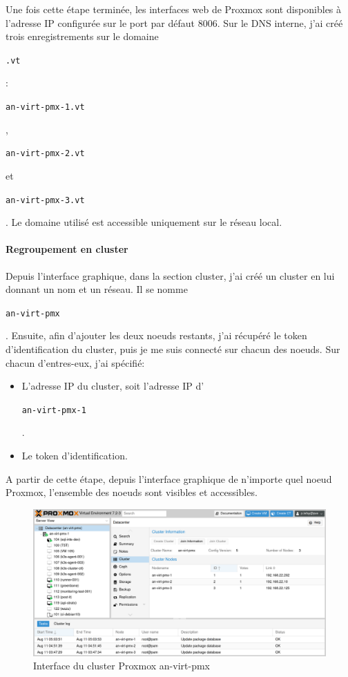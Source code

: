 \documentclass[12pt]{article}
\begin{document}
Une fois cette étape terminée, les interfaces web de \gls{Proxmox} sont disponibles à l'adresse \gls{IP} configurée sur le port par défaut 8006.
Sur le \gls{DNS} interne, j'ai créé trois enregistrements sur le domaine \begin{code}\texttt{.vt}\end{code}: \begin{code}\texttt{an-virt-pmx-1.vt}\end{code}, \begin{code}\texttt{an-virt-pmx-2.vt}\end{code} et \begin{code}\texttt{an-virt-pmx-3.vt}\end{code}.
Le domaine utilisé est accessible uniquement sur le réseau local.

\paragraph{Regroupement en \gls{cluster}}
Depuis l'interface graphique, dans la section \gls{cluster}, j'ai créé un \gls{cluster} en lui donnant un nom et un réseau. 
Il se nomme \begin{code}\texttt{an-virt-pmx}\end{code}.
Ensuite, afin d'ajouter les deux noeuds restants, j'ai récupéré le token d'identification du \gls{cluster}, puis je me suis connecté sur chacun des noeuds. 
Sur chacun d'entres-eux, j'ai spécifié:
\begin{itemize}
    \item L'adresse \gls{IP} du \gls{cluster}, soit l'adresse \gls{IP} d'\begin{code}\texttt{an-virt-pmx-1}\end{code}.
    \item Le token d'identification.
\end{itemize}

A partir de cette étape, depuis l'interface graphique de n'importe quel noeud \gls{Proxmox}, l'ensemble des noeuds sont visibles et accessibles.

\begin{figure}[ht!]
    \centering
        \includegraphics[width=\textwidth]{src/interface_proxmox_main.png}
    \caption{Interface du \gls{cluster} \gls{Proxmox} an-virt-pmx}
    \label{fig:proxmox_virt1}
\end{figure}
\end{document}
